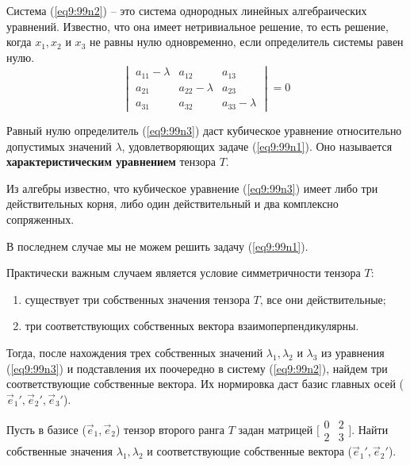 	 Система (\ref{eq9:99n2}) -- это система однородных линейных алгебраических уравнений. Известно, что она имеет нетривиальное решение, то есть решение, когда \( x_1, x_2 \) и \( x_3 \) не равны нулю одновременно, если определитель системы равен нулю.
	 \begin{equation} \begin{vmatrix}
		a_{11} - \lambda & a_{12} & a_{13} \\
		a_{21} & a_{22} - \lambda & a_{23} \\
		a_{31} & a_{32} & a_{33} - \lambda
	\end{vmatrix} = 0 \label{eq9:99n3} \end{equation}
	
	Равный нулю определитель (\ref{eq9:99n3}) даст кубическое уравнение относительно допустимых значений \( \lambda \), удовлетворяющих задаче (\ref{eq9:99n1}). Оно называется \textbf{характеристическим уравнением} тензора \( T \).
	
	Из алгебры известно, что кубическое уравнение (\ref{eq9:99n3}) имеет либо три действительных корня, либо один действительный и два комплексно сопряженных.
	
	В последнем случае мы не можем решить задачу (\ref{eq9:99n1}).
	
	Практически важным случаем является условие симметричности тензора \( T \):
	\begin{enumerate}
	\item
		существует три собственных значения тензора \( T \), все они действительные;
	\item
		три соответствующих собственных вектора взаимоперпендикулярны.
	\end{enumerate}
	
	Тогда, после нахождения трех собственных значений \( \lambda_1, \lambda_2 \) и \( \lambda_3 \) из уравнения (\ref{eq9:99n3}) и подставления их поочередно в систему (\ref{eq9:99n2}), найдем три соответствующие собственные вектора. Их нормировка даст базис главных осей (\( \vec{e}_1{'}, \vec{e}_2{'}, \vec{e}_3{'} \)).
	
	\begin{example}
	Пусть в базисе (\( \vec{e}_1, \vec{e}_2 \)) тензор второго ранга \( T \) задан матрицей  \( \bigl[ \begin{smallmatrix} 0 & 2 \\ 2 & 3 \end{smallmatrix} \bigr] \). Найти собственные значения \( \lambda_1, \lambda_2 \) и соответствующие собственные вектора (\( \vec{e}_1{'}, \vec{e}_2{'} \)).
	\end{example}
	

